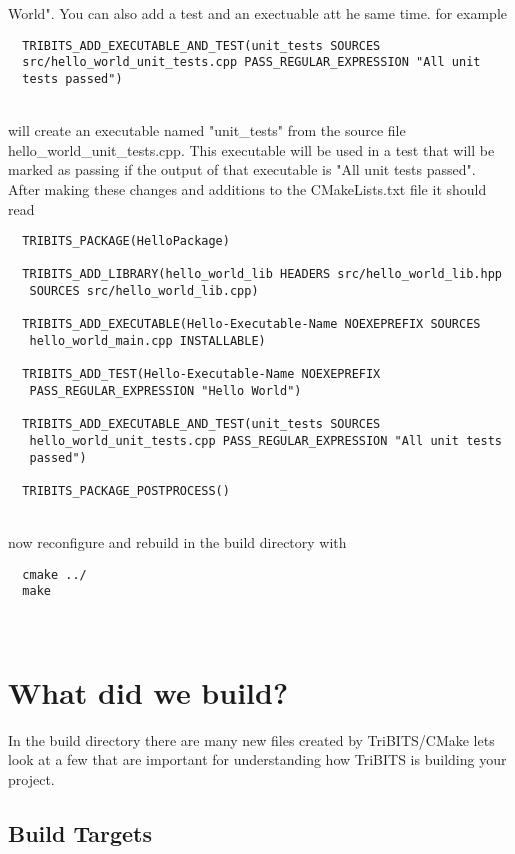 \documentclass[12pt]{article}
\begin{document}
World".  You can also add a test and an exectuable att he same
time. for example
\begin{verbatim}
  TRIBITS_ADD_EXECUTABLE_AND_TEST(unit_tests SOURCES
  src/hello_world_unit_tests.cpp PASS_REGULAR_EXPRESSION "All unit
  tests passed")
\end{verbatim}\\
will create an executable named "unit\_tests" from the source file
hello\_world\_unit\_tests.cpp.  This executable will be used in a test
that will be marked as passing if the output of that executable is
"All unit tests passed".  After making these changes and additions to
the CMakeLists.txt file it should read
\begin{verbatim}
  TRIBITS_PACKAGE(HelloPackage)

  TRIBITS_ADD_LIBRARY(hello_world_lib HEADERS src/hello_world_lib.hpp
   SOURCES src/hello_world_lib.cpp)

  TRIBITS_ADD_EXECUTABLE(Hello-Executable-Name NOEXEPREFIX SOURCES
   hello_world_main.cpp INSTALLABLE)

  TRIBITS_ADD_TEST(Hello-Executable-Name NOEXEPREFIX
   PASS_REGULAR_EXPRESSION "Hello World")

  TRIBITS_ADD_EXECUTABLE_AND_TEST(unit_tests SOURCES
   hello_world_unit_tests.cpp PASS_REGULAR_EXPRESSION "All unit tests
   passed")

  TRIBITS_PACKAGE_POSTPROCESS()
\end{verbatim}\\
now reconfigure and rebuild in the build directory with
\begin{verbatim}
  cmake ../
  make
\end{verbatim}\\

\section{What did we build?}

In the build directory there are many new files created by
TriBITS/CMake lets look at a few that are important for understanding
how TriBITS is building your project.

\subsection{Build Targets}
\end{document}
